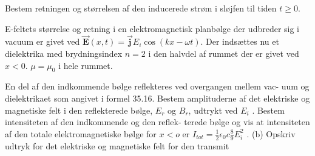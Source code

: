 \begin{figure}[ht]
    \centering
    \label{fig:opgave4}
\end{figure}
\begin{subexercise}[a]
Bestem retningen og størrelsen af den inducerede strøm i sløjfen til tiden $t\ge 0$.
\end{subexercise}
\begin{solution}

\end{solution}
\begin{exercise}[Opgave 5]
E-feltets størrelse og retning i en elektromagnetisk planbølge der udbreder
sig i vacuum er givet ved $\vec{\mathbf{E}} \left( x,t \right) = \vec{\mathbf{j}} E_i \cos\left( kx - \omega t \right) $. Der indsættes nu et
dielektrika med brydningsindex $n=2$ i den halvdel af rummet der er givet
ved $x<0$. $\mu = \mu_0$ i hele rummet.
\end{exercise}
\begin{subexercise}[a]
En del af den indkommende bølge reflekteres ved overgangen mellem vac-
uum og dielektrikaet som angivet i formel 35.16. Bestem amplituderne
af det elektriske og magnetiske felt i den reflekterede bølge, $E_r$ og $B_r$,
udtrykt ved $E_i$ . Bestem intensiteten af den indkommende og den reflek-
terede bølge og vis at intensiteten af den totale elektromagnetiske bølge
for $x<o$ er $I_{tot} = \frac{1}{2}\epsilon_0c \frac{8}{9}E_i^2$ .
(b) Opskriv udtryk for det elektriske og magnetiske felt for den transmit
\end{subexercise}
\begin{solution}

\end{solution}

